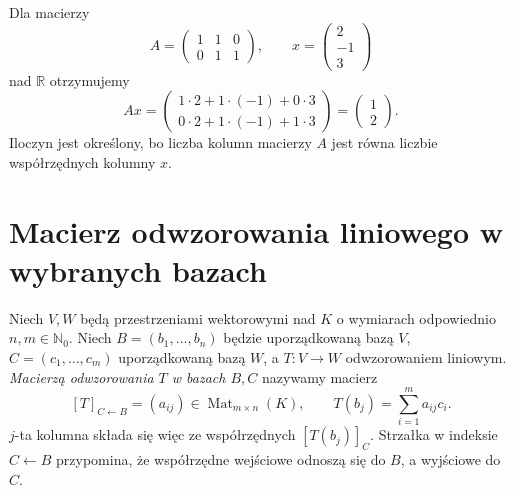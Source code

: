 \begin{przyklad}
\label{prz:lin4-iloczyn-kolumny}
Dla macierzy
\[
 A=\begin{pmatrix}1&1&0\\0&1&1\end{pmatrix},
 \qquad
 x=\begin{pmatrix}2\\-1\\3\end{pmatrix}
\]
nad \(\mathbb R\) otrzymujemy
\[
 Ax=\begin{pmatrix}
 1\cdot2+1\cdot(-1)+0\cdot3\\
 0\cdot2+1\cdot(-1)+1\cdot3
 \end{pmatrix}
 =\begin{pmatrix}1\\2\end{pmatrix}.
\]
Iloczyn jest określony, bo liczba kolumn
macierzy \(A\) jest równa liczbie
współrzędnych kolumny \(x\).
\end{przyklad}

\section{Macierz odwzorowania liniowego w wybranych bazach}
\label{sec:lin4-macierz-odwzorowania}

\begin{definicja}
\label{def:lin4-macierz-odwzorowania}
Niech \(V,W\) będą przestrzeniami wektorowymi
nad \(K\) o wymiarach odpowiednio \(n,m\in\mathbb N_0\).
Niech \(B=(b_1,\ldots,b_n)\) będzie uporządkowaną
bazą \(V\), \(C=(c_1,\ldots,c_m)\) uporządkowaną
bazą \(W\), a \(T\colon V\to W\) odwzorowaniem liniowym.
\emph{Macierzą odwzorowania \(T\) w bazach \(B,C\)}
nazywamy macierz
\[
 [T]_{C\leftarrow B}=(a_{ij})
 \in\operatorname{Mat}_{m\times n}(K),
 \qquad
 T(b_j)=\sum_{i=1}^{m}a_{ij}c_i.
\]
\(j\)-ta kolumna składa się więc ze współrzędnych
\([T(b_j)]_C\). Strzałka w indeksie
\(C\leftarrow B\) przypomina, że współrzędne
wejściowe odnoszą się do \(B\),
a wyjściowe do \(C\).
\end{definicja}

